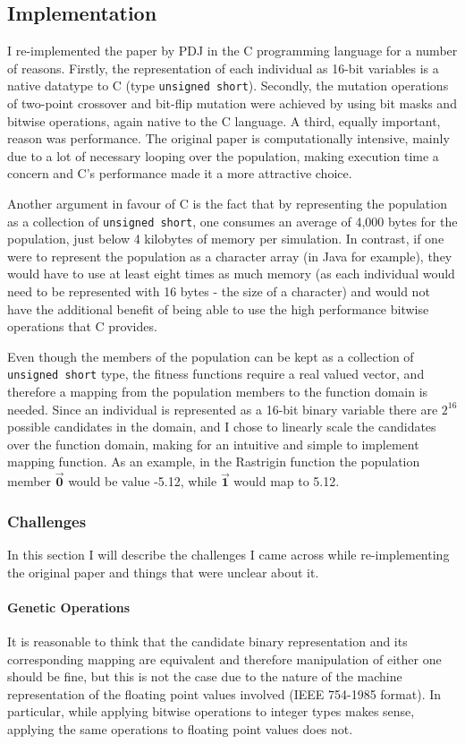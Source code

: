 \documentclass[12pt,a4paper,onecolumn]{article}
\begin{document}
\subsection{Implementation}
I re-implemented the paper by PDJ in the C programming language for a number of reasons. Firstly, the representation of each individual as 16-bit variables is a native datatype to C (type \texttt{unsigned short}). Secondly, the mutation operations of two-point crossover and bit-flip mutation were achieved by using bit masks and bitwise operations, again native to the C language. A third, equally important, reason was performance. The original paper is computationally intensive, mainly due to a lot of necessary looping over the population, making execution time a concern and C's performance made it a more attractive choice.

Another argument in favour of C is the fact that by representing the population as a collection of \texttt{unsigned short}, one consumes an average of 4,000 bytes for the population, just below 4 kilobytes of memory per simulation. In contrast, if one were to represent the population as a character array (in Java for example), they would have to use at least eight times as much memory (as each individual would need to be represented with 16 bytes - the size of a character) and would not have the additional benefit of being able to use the high performance bitwise operations that C provides.

Even though the members of the population can be kept as a collection of \texttt{unsigned short} type, the fitness functions require a real valued vector, and therefore a mapping from the population members to the function domain is needed. Since an individual is represented as a 16-bit binary variable there are $2^{16}$ possible candidates in the domain, and I chose to linearly scale the candidates over the function domain, making for an intuitive and simple to implement mapping function. As an example, in the Rastrigin function the population member $\overrightarrow{\mathbf{0}}$ would be value -5.12, while $\overrightarrow{\mathbf{1}}$ would map to 5.12.

\subsubsection{Challenges}
\label{challenges}
In this section I will describe the challenges I came across while re-implementing the original paper and things that were unclear about it.

\paragraph{Genetic Operations} It is reasonable to think that the candidate binary representation and its corresponding mapping are equivalent and therefore manipulation of either one should be fine, but this is not the case due to the nature of the machine representation of the floating point values involved (IEEE 754-1985 format). In particular, while applying bitwise operations to integer types makes sense, applying the same operations to floating point values does not. 
\end{document}
